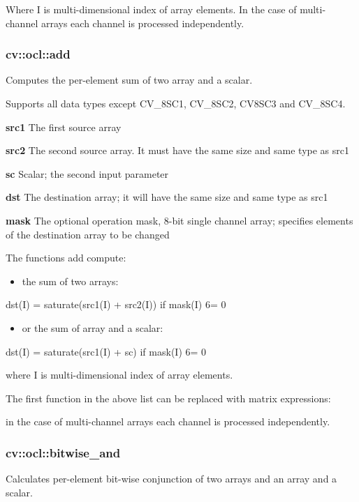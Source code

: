 \documentclass{article}
\begin{document}
Where I is multi-dimensional index of array elements. In the case of
multi-channel arrays each channel is processed independently.

\newpage

\subsubsection{cv::ocl::add}
\label{subsubsec:mylabel5}
Computes the per-element sum of two array and a scalar.

Supports all data types except CV{\_}8SC1, CV{\_}8SC2, CV8SC3 and
CV{\_}8SC4.

\textbf{src1} The first source array

\textbf{src2} The second source array. It must have the same size and same
type as src1

\textbf{sc} Scalar; the second input parameter

\textbf{dst } The destination array; it will have the same size and same
type as src1

\textbf{mask} The optional operation mask, 8-bit single channel array;
specifies elements of the destination array to be changed

The functions add compute:

\begin{itemize}
\item the sum of two arrays:
\end{itemize}
dst(I) = saturate(src1(I) + src2(I)) if mask(I) 6= 0

\begin{itemize}
\item or the sum of array and a scalar:
\end{itemize}
dst(I) = saturate(src1(I) + sc) if mask(I) 6= 0

where I is multi-dimensional index of array elements.

The first function in the above list can be replaced with matrix
expressions:

in the case of multi-channel arrays each channel is processed independently.

\newpage

\subsubsection{cv::ocl::bitwise{\_}and }
\label{subsubsec:mylabel6}
Calculates per-element bit-wise conjunction of two arrays and an array and a
scalar.
\end{document}
